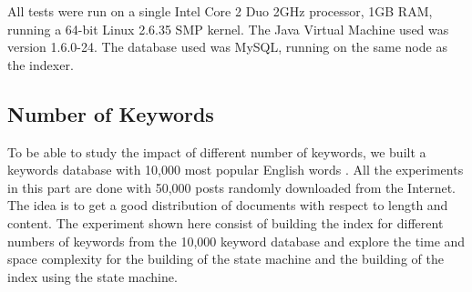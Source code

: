 \documentclass[10pt]{report}
\begin{document}
All tests were run on a single Intel Core 2 Duo 2GHz processor, 1GB
RAM, running a 64-bit Linux 2.6.35 SMP kernel. The Java Virtual
Machine used was version 1.6.0-24. The database used was MySQL,
running on the same node as the indexer.


\subsection{Number of Keywords}
To be able to study the impact of different number of keywords, we
built a keywords database with 10,000 most popular English
words \cite{wordlist}. All the experiments in this
part are done with 50,000 posts randomly downloaded from the Internet. The
idea is to get a good distribution of documents with respect to length
and content. The experiment shown here consist of building the index
for different numbers of keywords from the 10,000 keyword database and
explore the time and space complexity for the building of the state
machine and the building of the index using the state machine.
\end{document}
